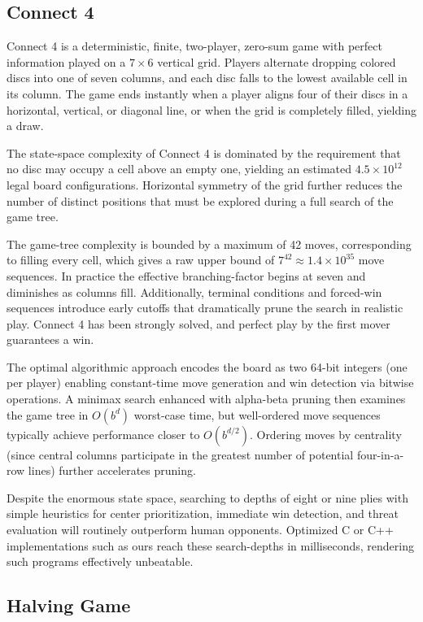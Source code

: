 \documentclass[12pt]{article}
\begin{document}
\subsection{Connect 4}

Connect 4 is a deterministic, finite, two-player, zero-sum game with perfect information played on a $7\times6$ vertical grid. Players alternate dropping colored discs into one of seven columns, and each disc falls to the lowest available cell in its column. The game ends instantly when a player aligns four of their discs in a horizontal, vertical, or diagonal line, or when the grid is completely filled, yielding a draw.

The state-space complexity of Connect 4 is dominated by the requirement that no disc may occupy a cell above an empty one, yielding an estimated $4.5\times10^{12}$ legal board configurations. Horizontal symmetry of the grid further reduces the number of distinct positions that must be explored during a full search of the game tree.

The \gls{game-tree} complexity is bounded by a maximum of 42 moves, corresponding to filling every cell, which gives a raw upper bound of $7^{42}\approx1.4\times10^{35}$ move sequences. In practice the effective \gls{branching-factor} begins at seven and diminishes as columns fill. Additionally, terminal conditions and forced-win sequences introduce early cutoffs that dramatically prune the search in realistic play. Connect 4 has been strongly solved, and perfect play by the first mover guarantees a win.

The optimal algorithmic approach encodes the board as two 64-bit integers (one per player) enabling constant-time move generation and win detection via bitwise operations. A minimax search enhanced with alpha-beta pruning then examines the game tree in $O(b^d)$ worst-case time, but well-ordered move sequences typically achieve performance closer to $O(b^{d/2})$. Ordering moves by centrality (since central columns participate in the greatest number of potential four-in-a-row lines) further accelerates pruning.

Despite the enormous state space, searching to depths of eight or nine plies with simple \glspl{heuristic} for center prioritization, immediate win detection, and threat evaluation will routinely outperform human opponents. Optimized C or C++ implementations such as ours reach these \glspl{search-depth} in milliseconds, rendering such programs effectively unbeatable.

\subsection{Halving Game}
\end{document}
